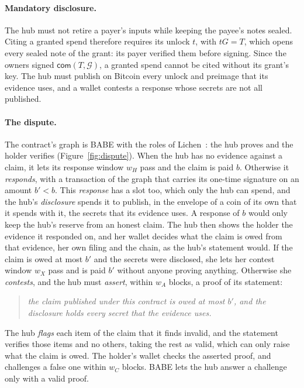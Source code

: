 \documentclass[11pt]{article}
\newcommand{\wH}{w_H}
\newcommand{\wA}{w_A}
\newcommand{\wC}{w_C}
\newcommand{\wX}{w_X}
\newcommand{\bresp}{b'}
\newcommand{\G}{\mathcal{G}}
\begin{document}
\paragraph{Mandatory disclosure.} The hub must not retire a payer's inputs while keeping the payee's notes sealed. Citing a granted spend therefore requires its unlock $t$, with $tG=T$, which opens every sealed note of the grant: its payer verified them before signing. Since the owners signed $\mathsf{com}(T,\G)$, a granted spend cannot be cited without its grant's key. The hub must publish on Bitcoin every unlock and preimage that its evidence uses, and a wallet contests a response whose secrets are not all published.

\paragraph{The dispute.} The contract's graph is BABE with the roles of Lichen~\cite[App.~A]{lichen}: the hub proves and the holder verifies (Figure~\ref{fig:dispute}). When the hub has no evidence against a claim, it lets its response window $\wH$ pass and the claim is paid $b$. Otherwise it \emph{responds}, with a transaction of the graph that carries its one-time signature on an amount $\bresp<b$. This \emph{response} has a slot too, which only the hub can spend, and the hub's \emph{disclosure} spends it to publish, in the envelope of a coin of its own that it spends with it, the secrets that its evidence uses. A response of $b$ would only keep the hub's reserve from an honest claim. The hub then shows the holder the evidence it responded on, and her wallet decides what the claim is owed from that evidence, her own filing and the chain, as the hub's statement would. If the claim is owed at most $\bresp$ and the secrets were disclosed, she lets her contest window $\wX$ pass and is paid $\bresp$ without anyone proving anything. Otherwise she \emph{contests}, and the hub must \emph{assert}, within $\wA$ blocks, a proof of its statement:
\begin{quote}
\emph{the claim published under this contract is owed at most $\bresp$, and the disclosure holds every secret that the evidence uses.}
\end{quote}
The hub \emph{flags} each item of the claim that it finds invalid, and the statement verifies those items and no others, taking the rest as valid, which can only raise what the claim is owed. The holder's wallet checks the asserted proof, and challenges a false one within $\wC$ blocks. BABE lets the hub answer a challenge only with a valid proof.
\end{document}
